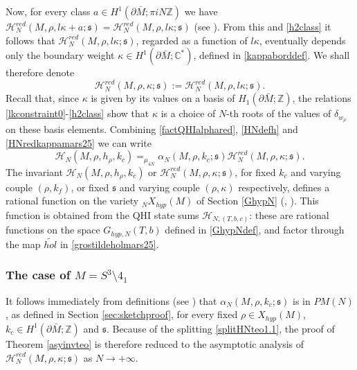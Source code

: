 \documentclass[11pt]{amsart}
\newcommand{\mc}{\mathbb{C}}
\newcommand{\mz}{\mathbb{Z}}
\newcommand{\Hh}{{\mathcal H}}
\newcommand{\ra}{\rightarrow}
\begin{document}
{Now, for every class $a \in H^1(\partial \bar M; \pi i N \mz)$ we have $\Hh_N^{red}(M,\rho,l\kappa + a;\mathfrak{s}) = \Hh_N^{red}(M,\rho,l\kappa;\mathfrak{s})$ (see \cite[Theorem 1.6 (3)]{NA}). From this and \eqref{h2class} it follows that $\Hh_N^{red}(M,\rho,l\kappa;\mathfrak{s})$, regarded as a function of $l\kappa$, eventually depends only the boundary weight $\kappa\in H^1(\partial \bar M; \mc^*)$, defined in \eqref{kappaborddef}. We shall therefore denote
\begin{equation}\label{HNredkappamars25}
\Hh_N^{red}(M,\rho,\kappa;\mathfrak{s}):=\Hh_N^{red}(M,\rho,l\kappa;\mathfrak{s}).
\end{equation}
Recall that, since $\kappa$ is given by its values on a basis of $H_1(\partial \bar{M};\mz)$, the relations \eqref{lkconstraint0}-\eqref{h2class} show that $\kappa$ is a choice of $N$-th roots of the values of $\delta_{w_\rho}$ on these basis elements. Combining \eqref{factQHIalphared}, \eqref{HNdefh} and \eqref{HNredkappamars25} we can write
\begin{equation}\label{splitHNteo1.1}
\Hh_{N}(M,\rho,h_\rho,k_c) =_{\mu_{4N}} \alpha_N(M,\rho,k_c;\mathfrak{s})\Hh_N^{red}(M,\rho,\kappa;\mathfrak{s}).
\end{equation}
The invariant $\Hh_N(M,\rho,h_\rho,k_c)$ or $\Hh_N^{red}(M,\rho,\kappa;\mathfrak{s})$, for fixed $k_c$ and varying couple $(\rho,k_f)$, or fixed $\mathfrak{s}$ and varying couple $(\rho,\kappa)$ respectively, defines a rational function on the variety ${}_NX_{hyp}(M)$ of Section \ref{GhypN}  (\cite[Theorem 1.1]{AGT}, \cite[Corollary 1.8]{NA}). This function is obtained from the QHI state sums $\Hh_{N,(T,b,c)}$: these are rational functions on the space $G_{hyp,N}(T,b)$ defined in \eqref{GhypNdef}, and factor through the map $\widetilde{hol}$ in \eqref{grostildeholmars25}. 

\subsubsection{The case of $M=S^3\setminus 4_1$}\label{caseMsplitmars25} It follows immediately from definitions (see \cite[Section 8]{NA}) that $\alpha_N(M,\rho,k_c;\mathfrak{s})$ is in $PM(N)$, as defined in Section \ref{sec:sketchproof}, for every fixed $\rho\in X_{hyp}(M)$, $k_c\in H^1(\partial \bar M;\mz)$ and $\mathfrak{s}$. Because of the splitting \eqref{splitHNteo1.1}, the proof of Theorem \ref{asyinvteo} is therefore reduced to the asymptotic analysis of $\Hh_N^{red}(M,\rho,\kappa;\mathfrak{s})$ as $N\ra +\infty$.

}
\end{document}

